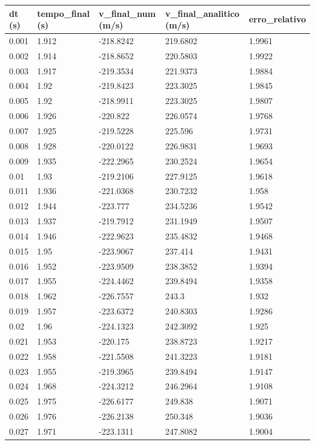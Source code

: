 \begin{tabular}{lllll}
\toprule
dt (s) & tempo\_final (s) & v\_final\_num (m/s) & v\_final\_analitico (m/s) & erro\_relativo \\
\midrule
0.001 & 1.912 & -218.8242 & 219.6802 & 1.9961 \\
0.002 & 1.914 & -218.8652 & 220.5803 & 1.9922 \\
0.003 & 1.917 & -219.3534 & 221.9373 & 1.9884 \\
0.004 & 1.92 & -219.8423 & 223.3025 & 1.9845 \\
0.005 & 1.92 & -218.9911 & 223.3025 & 1.9807 \\
0.006 & 1.926 & -220.822 & 226.0574 & 1.9768 \\
0.007 & 1.925 & -219.5228 & 225.596 & 1.9731 \\
0.008 & 1.928 & -220.0122 & 226.9831 & 1.9693 \\
0.009 & 1.935 & -222.2965 & 230.2524 & 1.9654 \\
0.01 & 1.93 & -219.2106 & 227.9125 & 1.9618 \\
0.011 & 1.936 & -221.0368 & 230.7232 & 1.958 \\
0.012 & 1.944 & -223.777 & 234.5236 & 1.9542 \\
0.013 & 1.937 & -219.7912 & 231.1949 & 1.9507 \\
0.014 & 1.946 & -222.9623 & 235.4832 & 1.9468 \\
0.015 & 1.95 & -223.9067 & 237.414 & 1.9431 \\
0.016 & 1.952 & -223.9509 & 238.3852 & 1.9394 \\
0.017 & 1.955 & -224.4462 & 239.8494 & 1.9358 \\
0.018 & 1.962 & -226.7557 & 243.3 & 1.932 \\
0.019 & 1.957 & -223.6372 & 240.8303 & 1.9286 \\
0.02 & 1.96 & -224.1323 & 242.3092 & 1.925 \\
0.021 & 1.953 & -220.175 & 238.8723 & 1.9217 \\
0.022 & 1.958 & -221.5508 & 241.3223 & 1.9181 \\
0.023 & 1.955 & -219.3965 & 239.8494 & 1.9147 \\
0.024 & 1.968 & -224.3212 & 246.2964 & 1.9108 \\
0.025 & 1.975 & -226.6177 & 249.838 & 1.9071 \\
0.026 & 1.976 & -226.2138 & 250.348 & 1.9036 \\
0.027 & 1.971 & -223.1311 & 247.8082 & 1.9004 \\

\end{tabular}

